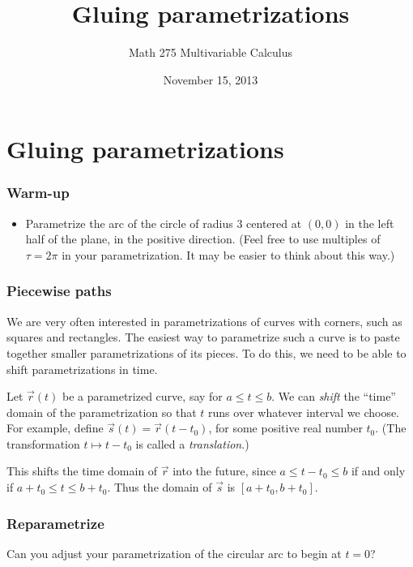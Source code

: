 \documentclass[11pt,ignorenonframetext,aspectratio=169,xcolor={svgnames}]{beamer}
\title{Gluing parametrizations}
\author{Math 275 Multivariable Calculus}
\date{November 15, 2013}
\begin{document}
\frame{\titlepage}

\section{Gluing parametrizations}

\begin{frame}\frametitle{Warm-up}

\begin{itemize}[<+->]
\itemsep1pt\parskip0pt
\item
  Parametrize the arc of the circle of radius $3$ centered at $(0,0)$ in
  the left half of the plane, in the positive direction. (Feel free to
  use multiples of $\tau = 2\pi$ in your parametrization. It may be
  easier to think about this way.)
\end{itemize}

\end{frame}

\begin{frame}\frametitle{Piecewise paths}

We are very often interested in parametrizations of curves with corners,
such as squares and rectangles. The easiest way to parametrize such a
curve is to paste together smaller parametrizations of its pieces. To do
this, we need to be able to shift parametrizations in time.

Let $\vec{r}(t)$ be a parametrized curve, say for $a \leq t \leq b$. We
can \emph{shift} the ``time'' domain of the parametrization so that $t$
runs over whatever interval we choose. For example, define
$\vec{s}(t) = \vec{r}(t - t_0)$, for some positive real number $t_0$.
(The transformation $t \mapsto t - t_0$ is called a \emph{translation}.)

This shifts the time domain of $\vec{r}$ into the future, since
$a \leq t - t_0 \leq b$ if and only if $a + t_0 \leq t \leq b + t_0$.
Thus the domain of $\vec{s}$ is $[a + t_0, b+t_0]$.

\end{frame}

\begin{frame}\frametitle{Reparametrize}

Can you adjust your parametrization of the circular arc to begin at
$t = 0$?

\end{frame}
\end{document}
